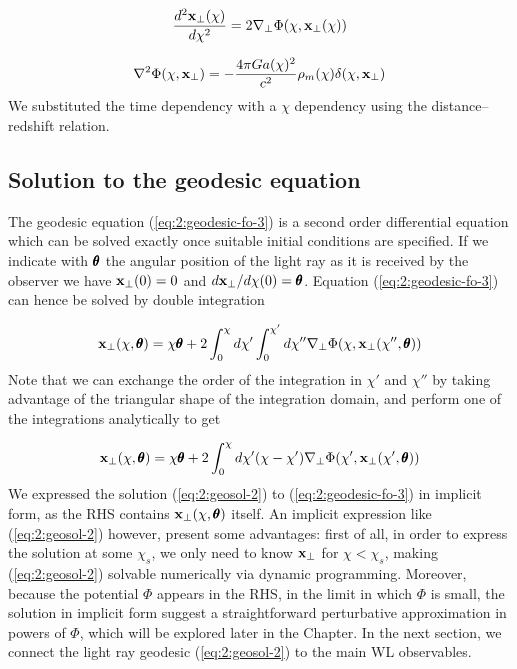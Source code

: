 \begin{equation}
\label{eq:2:geodesic-fo-3}
\frac{d^2\mathbf{x}_\perp(\chi)}{d\chi^2} = 2\nabla_\perp\Phi(\chi,\mathbf{x}_\perp(\chi))
\end{equation}

\begin{equation}
\label{eq:2:poisson}
\nabla^2\Phi(\chi,\mathbf{x}_\perp) = -\frac{4\pi Ga(\chi)^2}{c^2}\rho_m(\chi)\delta(\chi,\mathbf{x}_\perp)
\end{equation}  
%
We substituted the time dependency with a $\chi$ dependency using the distance--redshift relation. 

\subsection{Solution to the geodesic equation}
The geodesic equation (\ref{eq:2:geodesic-fo-3}) is a second order differential equation which can be solved exactly once suitable initial conditions are specified. If we indicate with $\pmb{\theta}$ the angular position of the light ray as it is received by the observer we have $\mathbf{x}_\perp(0)=0$ and $d\mathbf{x}_\perp /d\chi(0)=\pmb{\theta}$. Equation (\ref{eq:2:geodesic-fo-3}) can hence be solved by double integration

\begin{equation}
\label{eq:2:geosol-1}
\mathbf{x}_\perp(\chi,\pmb{\theta}) = \chi\pmb{\theta} + 2\int_0^\chi d\chi'\int_0^{\chi'}d\chi'' \nabla_\perp\Phi(\chi,\mathbf{x}_\perp(\chi'',\pmb{\theta}))
\end{equation} 
%
Note that we can exchange the order of the integration in $\chi'$ and $\chi''$ by taking advantage of the triangular shape of the integration domain, and perform one of the integrations analytically to get

\begin{equation}
\label{eq:2:geosol-2}
\mathbf{x}_\perp(\chi,\pmb{\theta}) = \chi\pmb{\theta} + 2\int_0^\chi d\chi'(\chi-\chi')\nabla_\perp\Phi(\chi',\mathbf{x}_\perp(\chi',\pmb{\theta}))
\end{equation} 
%
We expressed the solution (\ref{eq:2:geosol-2}) to (\ref{eq:2:geodesic-fo-3}) in implicit form, as the RHS contains $\mathbf{x}_\perp(\chi,\pmb{\theta})$ itself. An implicit expression like (\ref{eq:2:geosol-2}) however, present some advantages: first of all, in order to express the solution at some $\chi_s$, we only need to know $\mathbf{x}_\perp$ for $\chi<\chi_s$, making (\ref{eq:2:geosol-2}) solvable numerically via dynamic programming. Moreover, because the potential $\Phi$ appears in the RHS, in the limit in which $\Phi$ is small, the solution in implicit form suggest a straightforward perturbative approximation in powers of $\Phi$, which will be explored later in the Chapter. In the next section, we connect the light ray geodesic (\ref{eq:2:geosol-2}) to the main WL observables.  


